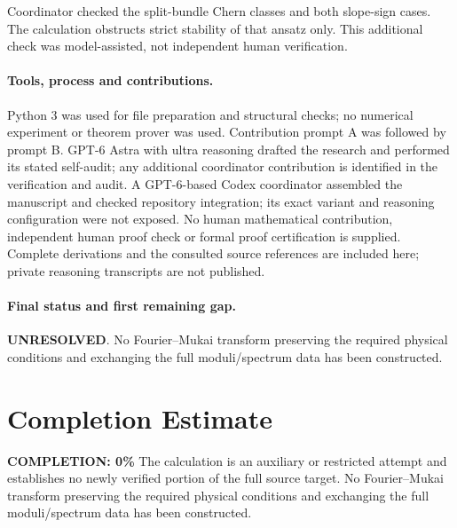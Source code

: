 \documentclass[11pt]{article}
\begin{document}
Coordinator checked the split-bundle Chern classes and both slope-sign cases. The calculation obstructs strict stability of that ansatz only. This additional check was model-assisted, not independent human verification.

\paragraph{Tools, process and contributions.}
Python 3 was used for file preparation and structural checks; no numerical experiment or theorem prover was used. Contribution prompt A was followed by prompt B. GPT-6 Astra with ultra reasoning drafted the research and performed its stated self-audit; any additional coordinator contribution is identified in the verification and audit. A GPT-6-based Codex coordinator assembled the manuscript and checked repository integration; its exact variant and reasoning configuration were not exposed. No human mathematical contribution, independent human proof check or formal proof certification is supplied. Complete derivations and the consulted source references are included here; private reasoning transcripts are not published.

\paragraph{Final status and first remaining gap.}
\textbf{UNRESOLVED}. No Fourier--Mukai transform preserving the required physical conditions and exchanging the full moduli/spectrum data has been constructed.

\section{Completion Estimate}
\noindent\textbf{COMPLETION: 0\%}
The calculation is an auxiliary or restricted attempt and establishes no newly verified portion of the full source target. No Fourier--Mukai transform preserving the required physical conditions and exchanging the full moduli/spectrum data has been constructed.
\end{document}
